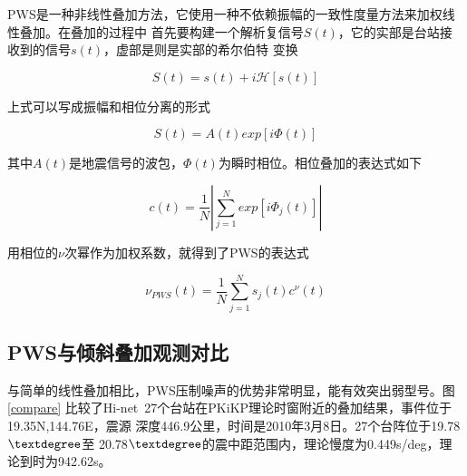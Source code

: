 PWS是一种非线性叠加方法，它使用一种不依赖振幅的一致性度量方法来加权线性叠加。在叠加的过程中
首先要构建一个解析复信号$S(t)$，它的实部是台站接收到的信号$s(t)$，虚部是则是实部的希尔伯特
变换

\begin{equation}
S(t) = s(t) + i \mathscr{H} [s(t)]
\end{equation}

上式可以写成振幅和相位分离的形式

\begin{equation}
S(t) = A(t) exp[i \Phi (t)]
\end{equation}

其中$A(t)$是地震信号的波包，$\Phi (t)$为瞬时相位。相位叠加的表达式如下

\begin{equation}
c(t) = \frac{1}{N} \left| \sum_{j=1}^{N} exp[i \Phi_j (t)] \right|
\end{equation}

用相位的$\nu$次幂作为加权系数，就得到了PWS的表达式

\begin{equation}
 \nu_{PWS}(t) = \frac{1}{N} \sum_{j=1}^{N} s_j (t)c^{\nu} (t)
\end{equation}

\subsection{PWS与倾斜叠加观测对比}

与简单的线性叠加相比，PWS压制噪声的优势非常明显，能有效突出弱型号。图\ref{compare}
比较了Hi-net~27个台站在PKiKP理论时窗附近的叠加结果，事件位于19.35N,144.76E，震源
深度446.9公里，时间是2010年3月8日。27个台阵位于19.78$\textdegree$至
20.78$\textdegree$的震中距范围内，理论慢度为0.449s/deg，理论到时为942.62s。

